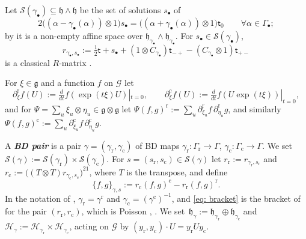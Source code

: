 \documentclass[a4paper]{amsart}
\numberwithin{equation}{section}
\theoremstyle{definition}
\theoremstyle{remark}
\newcommand{\mfh}{\mathfrak{h}}
\newcommand{\mfg}{\mathfrak{g}}
\newcommand{\mcG}{\mathcal{G}}
\newcommand{\mcH}{\mathcal{H}}
\newcommand{\mcS}{\mathcal{S}}
\newcommand{\rr}{\mathrm{r}}
\newcommand{\cc}{\mathrm{c}}
\newcommand{\Cas}{\mathsf t}
\newcommand{\newword}[1]{\textbf{\emph{#1}}}
\begin{document}
Let $\mcS(\gamma_\bullet)\subseteq\mfh\wedge\mfh$ be the set of solutions $s_\bullet$ of
\begin{equation}
  \label{eq: system s}
  2\big((\alpha-\gamma_\bullet(\alpha))\otimes1\big)s_\bullet=\big((\alpha+\gamma_\bullet(\alpha))\otimes1\big)\Cas_0
  \qquad\forall\alpha\in\Gamma_\bullet;
\end{equation}
by \cite{BD82} it is a non-empty affine space over $\mfh_{\gamma_\bullet}\wedge\mfh_{\gamma_\bullet}$.
For $s_\bullet\in\mcS(\gamma_\bullet)$,
\[
  r_{\gamma_\bullet,s_\bullet}:=\tfrac12\Cas+s_\bullet+(1\otimes C_{\gamma_\bullet})\Cas_{-+}-(C_{\gamma_\bullet}\otimes1)\Cas_{+-}
\]
is a classical $R$-matrix \cite{BD82}.

For $\xi\in\mfg$ and a function $f$ on $\mcG$ let
\[
  \partial^\rr_\xi f(U):=\tfrac{d}{dt}f(\exp(t\xi)U)|_{t=0},
  \qquad
  \partial^\cc_\xi f(U):=\tfrac{d}{dt}f(U\exp(t\xi))|_{t=0},
\]
and for $\Psi=\sum_u\xi_u\otimes\eta_u\in\mfg\otimes\mfg$ let $\Psi(f,g)^\rr:=\sum_u\partial^\rr_{\xi_u}f\,\partial^\rr_{\eta_u}g$, and similarly $\Psi(f,g)^\cc:=\sum_u\partial^\cc_{\xi_u}f\,\partial^\cc_{\eta_u}g$.

A \newword{BD pair} is a pair $\gamma=(\gamma_{\rr},\gamma_{\cc})$ of BD maps $\gamma_{\rr}:\Gamma_{\rr}\to\Gamma$, $\gamma_{\cc}:\Gamma_{\cc}\to\Gamma$.
We set $\mcS(\gamma):=\mcS(\gamma_{\rr})\times\mcS(\gamma_{\cc})$.
For $s=(s_{\rr},s_{\cc})\in\mcS(\gamma)$ let $r_\rr:=r_{\gamma_{\rr},s_{\rr}}$ and $r_\cc:=\big((T\otimes T)r_{\gamma_{\cc},s_{\cc}}\big)^{21}$, where $T$ is the transpose, and define
\begin{equation}
  \label{eq: bracket}
  \{f,g\}_{\gamma,s}:=r_\cc(f,g)^\cc-r_\rr(f,g)^\rr.
\end{equation}
In the notation of \cite{GSV19,GSV23}, $\gamma_{\rr}=\gamma^\rr$ and $\gamma_{\cc}=(\gamma^\cc)^{-1}$, and \eqref{eq: bracket} is the bracket of \cite[Section~2.2]{GSV23} for the pair $(r_\rr,r_\cc)$, which is Poisson \cite[Section~2.2]{GSV23}, \cite[Section~2.2]{GSV19}.
We set~$\mfh_\gamma:=\mfh_{\gamma_{\rr}}\oplus\mfh_{\gamma_{\cc}}$ and $\mcH_\gamma:=\mcH_{\gamma_{\rr}}\times\mcH_{\gamma_{\cc}}$, acting on $\mcG$ by $(y_{\rr},y_{\cc})\cdot U=y_{\rr}Uy_{\cc}$.
\end{document}
